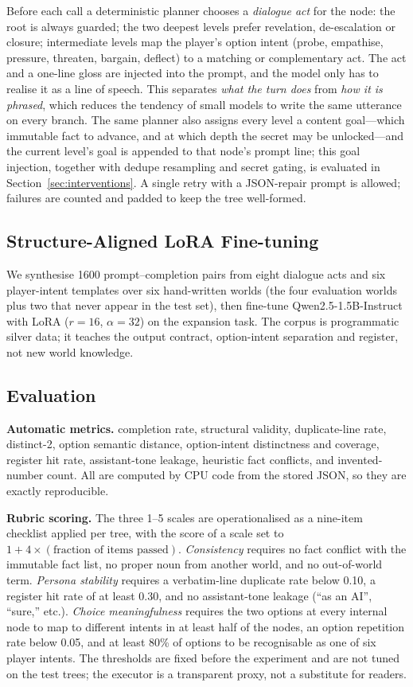 \documentclass[conference]{IEEEtran}
\begin{document}
Before each call a deterministic planner chooses a \emph{dialogue act} for the node: the root is
always guarded; the two deepest levels prefer revelation, de-escalation or closure; intermediate
levels map the player's option intent (probe, empathise, pressure, threaten, bargain, deflect) to a
matching or complementary act. The act and a one-line gloss are injected into the prompt, and the
model only has to realise it as a line of speech. This separates \emph{what the turn does} from
\emph{how it is phrased}, which reduces the tendency of small models to write the same utterance on
every branch. The same planner also assigns every level a content goal---which immutable fact to
advance, and at which depth the secret may be unlocked---and the current level's goal is appended to
that node's prompt line; this goal injection, together with dedupe resampling and secret gating, is
evaluated in Section~\ref{sec:interventions}. A single retry with a JSON-repair prompt is allowed;
failures are counted and padded to keep the tree well-formed.

\subsection{Structure-Aligned LoRA Fine-tuning}
We synthesise 1600 prompt--completion pairs from eight dialogue acts and six player-intent
templates over six hand-written worlds (the four evaluation worlds plus two that never appear in the
test set), then fine-tune Qwen2.5-1.5B-Instruct with LoRA ($r=16$, $\alpha=32$) on the expansion
task. The corpus is programmatic silver data; it teaches
the output contract, option-intent separation and register, not new world knowledge.

\subsection{Evaluation}
\textbf{Automatic metrics.} completion rate, structural validity, duplicate-line rate,
distinct-2, option semantic distance, option-intent distinctness and coverage, register hit rate,
assistant-tone leakage, heuristic fact conflicts, and invented-number count. All are computed by
CPU code from the stored JSON, so they are exactly reproducible.

\textbf{Rubric scoring.} The three 1--5 scales are operationalised as a nine-item checklist applied
per tree, with the score of a scale set to $1+4\times(\text{fraction of items passed})$.
\emph{Consistency} requires no fact conflict with the immutable fact list, no proper noun from
another world, and no out-of-world term. \emph{Persona stability} requires a verbatim-line
duplicate rate below 0.10, a register hit rate of at least 0.30, and no assistant-tone leakage
(``as an AI'', ``sure,'' etc.). \emph{Choice meaningfulness} requires the two options at every
internal node to map to different intents in at least half of the nodes, an option
repetition rate below 0.05, and at least 80\% of options to be recognisable as one of six player
intents. The thresholds are fixed before the experiment and are not tuned on the test trees; the
executor is a transparent proxy, not a substitute for readers.
\end{document}
